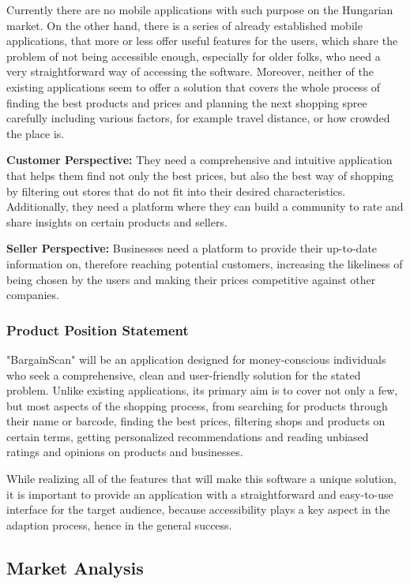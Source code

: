 Currently there are no mobile applications with such purpose on the Hungarian market. On the other hand, there is a series of already established mobile applications, that more or less offer useful features for the users, which share the problem of not being accessible enough, especially for older folks, who need a very straightforward way of accessing the software. Moreover, neither of the existing applications seem to offer a solution that covers the whole process of finding the best products and prices and planning the next shopping spree carefully including various factors, for example travel distance, or how crowded the place is.

\textbf{Customer Perspective:}
They need a comprehensive and intuitive application that helps them find not only the best prices, but also the best way of shopping by filtering out stores that do not fit into their desired characteristics. Additionally, they need a platform where they can build a community to rate and share insights on certain products and sellers.

\textbf{Seller Perspective:}
Businesses need a platform to provide their up-to-date information on, therefore reaching potential customers, increasing the likeliness of being chosen by the users and making their prices competitive against other companies.

\subsubsection{Product Position Statement}

"BargainScan" will be an application designed for money-conscious individuals who seek a comprehensive, clean and user-friendly solution for the stated problem. Unlike existing applications, its primary aim is to cover not only a few, but most aspects of the shopping process, from searching for products through their name or barcode, finding the best prices, filtering shops and products on certain terms, getting personalized recommendations and reading unbiased ratings and opinions on products and businesses. 

While realizing all of the features that will make this software a unique solution, it is important to provide an application with a straightforward and easy-to-use interface for the target audience, because accessibility plays a key aspect in the adaption process, hence in the general success.

\pagebreak

\subsection{Market Analysis}

